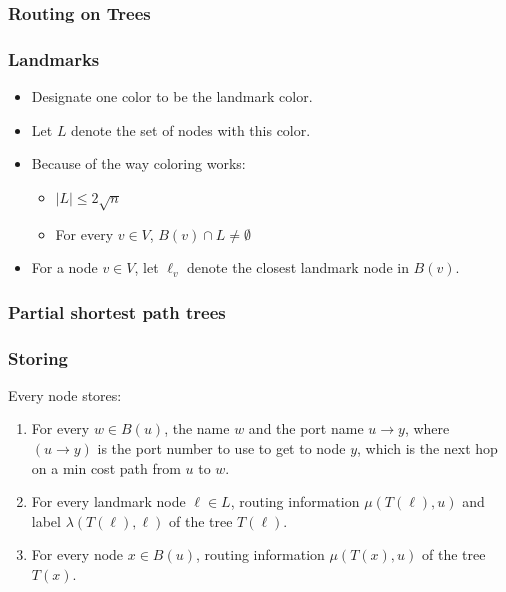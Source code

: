 \documentclass[10pt, compress]{beamer}
\begin{document}
\begin{frame}[fragile]
  \frametitle{Routing on Trees}


\end{frame}

\begin{frame}[fragile]
  \frametitle{Landmarks}
  \begin{itemize}
    \item Designate one color to be the landmark color.
    \item Let $L$ denote the set of nodes with this color.
    \item Because of the way coloring works:
    \begin{itemize}
        \item $|L| \leq 2 \sqrt{n}$
        \item For every $v\in V$, $B(v)\cap L \neq \emptyset$
    \end{itemize}
    \item For a node $v\in V$, let $\ell_v$ denote the closest landmark node in $B(v)$.
  \end{itemize}

\end{frame}

\begin{frame}[fragile]
  \frametitle{Partial shortest path trees}


\end{frame}

\begin{frame}[fragile]
  \frametitle{Storing}

  Every node stores:
  \begin{enumerate}
    \item For every $w\in B(u)$, the name $w$ and the port name $u\rightarrow y$, where $(u\rightarrow y)$ is the port number to use to get to node $y$, which is the next hop on a min cost path from $u$ to $w$.
    \item For every landmark node $\ell \in L$, routing information $\mu(T(\ell),u)$ and label $\lambda(T(\ell),\ell)$ of the tree $T(\ell)$.
    \item For every node $x\in B(u)$, routing information $\mu(T(x),u)$ of the tree $T(x)$.
\end{enumerate}


\end{frame}
\end{document}

